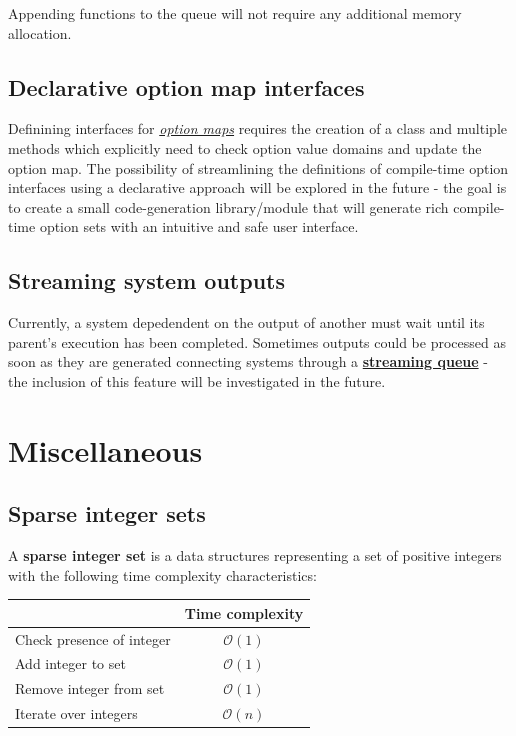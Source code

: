 \documentclass[oneside, 12pt, a4paper, openany]{book}
\begin{document}
Appending functions to the queue will not require any additional memory
allocation.

\section{Declarative option map
interfaces}\label{declarative-option-map-interfaces}

Definining interfaces for
\protect\hyperlink{metaprogramming_option_maps}{\emph{option maps}}
requires the creation of a class and multiple methods which explicitly
need to check option value domains and update the option map. The
possibility of streamlining the definitions of compile-time option
interfaces using a declarative approach will be explored in the future -
the goal is to create a small code-generation library/module that will
generate rich compile-time option sets with an intuitive and safe user
interface.

\section{Streaming system outputs}\label{streaming-system-outputs}

Currently, a system depedendent on the output of another must wait until
its parent's execution has been completed. Sometimes outputs could be
processed as soon as they are generated connecting systems through a
\protect\hyperlink{sys_streamqueue}{\textbf{streaming queue}} - the
inclusion of this feature will be investigated in the future.

\chapter{Miscellaneous}\label{miscellaneous}

\hypertarget{appendix_sparse_integer_sets}{\section{Sparse integer
sets}\label{appendix_sparse_integer_sets}}

A \textbf{sparse integer set} is a data structures representing a set of
positive integers with the following time complexity characteristics:

\begin{longtable}[]{@{}lc@{}}
\toprule
\begin{minipage}[b]{0.48\columnwidth}\raggedright\strut
\strut
\end{minipage} & \begin{minipage}[b]{0.48\columnwidth}\centering\strut
Time complexity\strut
\end{minipage}\tabularnewline
\midrule
\endhead
Check presence of integer & \(\mathcal{O}(1)\)\tabularnewline
Add integer to set & \(\mathcal{O}(1)\)\tabularnewline
Remove integer from set & \(\mathcal{O}(1)\)\tabularnewline
Iterate over integers & \(\mathcal{O}(n)\)\tabularnewline
\bottomrule
\end{longtable}
\end{document}

